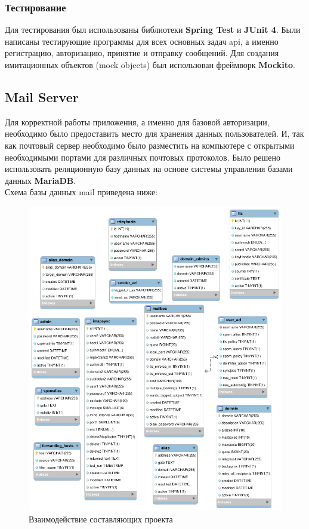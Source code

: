 \documentclass{article}
\begin{document}
\subsubsection{Тестирование}
Для тестирования был использованы библиотеки \textbf{Spring Test} и \textbf{JUnit 4}. Были написаны тестирующие программы для всех основных задач api, а именно регистрацию, авторизацию, принятие и отправку сообщений. Для создания имитационных объектов (mock objects) был использован фреймворк \textbf{Mockito}.

\subsection{Mail Server}
Для корректной работы приложения, а именно для базовой авторизации, необходимо было предоставить место для хранения данных пользователей. И, так как почтовый сервер необходимо было разместить на компьютере с открытыми необходимыми портами для различных почтовых протоколов. Было решено использовать реляционную базу данных на основе системы управления базами данных \textbf{MariaDB}. \\

Схема базы данных mail приведена ниже:
\begin{figure}[H]
        \begin{flushleft}        \centerline{\includegraphics[scale=0.4]{scheme2.png}}
        \caption{Взаимодействие составляющих проекта}
        \end{flushleft}
\end{figure}
\end{document}
